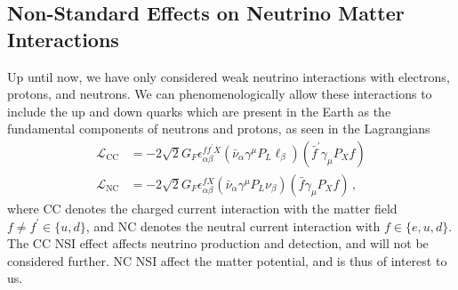 \subsection{Non-Standard Effects on Neutrino Matter Interactions}
Up until now, we have only considered weak neutrino interactions with electrons, protons, and neutrons.
We can phenomenologically allow these interactions to include the up and down quarks which are present 
in the Earth as the fundamental components of neutrons and protons, as seen in the Lagrangians
\begin{align*}
    \mathcal{L}_{\mathrm{CC}} &= -2 \sqrt{2} G_{F} \epsilon_{\alpha \beta}^{f f^{\prime} X}\left(\bar{\nu}_{\alpha} \gamma^{\mu} P_{L} \ell_{\beta}\right)\left(\bar{f}^{\prime} \gamma_{\mu} P_{X} f\right) \\
    \mathcal{L}_{\mathrm{NC}} &= -2 \sqrt{2} G_{F} \epsilon_{\alpha \beta}^{f X}\left(\bar{\nu}_{\alpha} \gamma^{\mu} P_{L} \nu_{\beta}\right)\left(\bar{f} \gamma_{\mu} P_{X} f\right)\,,
\end{align*}
where CC denotes the charged current interaction with the matter field $f\neq f^\prime \in \{u,d\}$, and NC denotes the neutral current interaction with 
$f \in \{e,u,d\}$. The CC NSI effect affects neutrino production and detection, and will not be considered further. NC NSI affect the matter potential, 
and is thus of interest to us.

